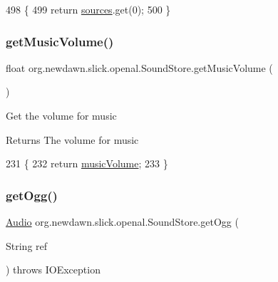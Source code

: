 \begin{DoxyCode}
498                                  \{
499         \textcolor{keywordflow}{return} \mbox{\hyperlink{classorg_1_1newdawn_1_1slick_1_1openal_1_1_sound_store_a3a2ffa73acd847102bb30140129c440b}{sources}}.get(0);
500     \}
\end{DoxyCode}
\mbox{\label{classorg_1_1newdawn_1_1slick_1_1openal_1_1_sound_store_aee392a77caa99f7a2240ed4fd677b4fb}} 
\subsubsection{\texorpdfstring{get\+Music\+Volume()}{getMusicVolume()}}
{\footnotesize\ttfamily float org.\+newdawn.\+slick.\+openal.\+Sound\+Store.\+get\+Music\+Volume (\begin{DoxyParamCaption}{ }\end{DoxyParamCaption})\hspace{0.3cm}{\ttfamily [inline]}}

Get the volume for music

\begin{DoxyReturn}{Returns}
The volume for music 
\end{DoxyReturn}

\begin{DoxyCode}
231                                   \{
232         \textcolor{keywordflow}{return} \mbox{\hyperlink{classorg_1_1newdawn_1_1slick_1_1openal_1_1_sound_store_a1394ddfb866b8bc402414b8f861227c0}{musicVolume}};
233     \}
\end{DoxyCode}
\mbox{\label{classorg_1_1newdawn_1_1slick_1_1openal_1_1_sound_store_a75fa2225dccc26b91963964706a18098}} 
\subsubsection{\texorpdfstring{get\+Ogg()}{getOgg()}\hspace{0.1cm}{\footnotesize\ttfamily [1/3]}}
{\footnotesize\ttfamily \mbox{\hyperlink{interfaceorg_1_1newdawn_1_1slick_1_1openal_1_1_audio}{Audio}} org.\+newdawn.\+slick.\+openal.\+Sound\+Store.\+get\+Ogg (\begin{DoxyParamCaption}\item[{String}]{ref }\end{DoxyParamCaption}) throws I\+O\+Exception\hspace{0.3cm}{\ttfamily [inline]}}

